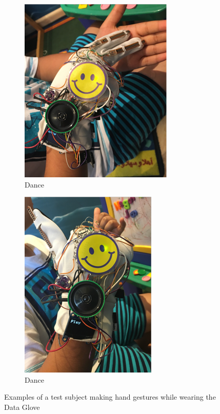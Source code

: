 \begin{figure}
    \centering
    \begin{subfigure}{.4\linewidth}
        \centering
        \setlength\figureheight{\linewidth}
        \setlength\figurewidth{\linewidth}
        \includegraphics{./assets/img/Dance}
        \caption{Dance}
        \label{fig:dance}
    \end{subfigure}
    \hspace{1cm}
    \begin{subfigure}{.4\linewidth}
        \centering
        \includegraphics{./assets/img/Play}
        \caption{Dance}
        \label{fig:play}
    \end{subfigure}
    \caption{Examples of a test subject making hand gestures while wearing the Data Glove}
    \label{fig:examplegestures}
\end{figure}


